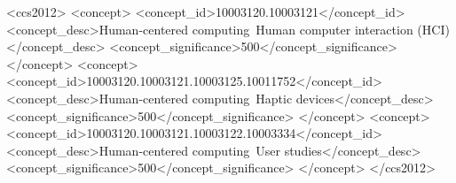 
\begin{CCSXML}
	<ccs2012>
	<concept>
	<concept_id>10003120.10003121</concept_id>
	<concept_desc>Human-centered computing~Human computer interaction (HCI)</concept_desc>
	<concept_significance>500</concept_significance>
	</concept>
	<concept>
	<concept_id>10003120.10003121.10003125.10011752</concept_id>
	<concept_desc>Human-centered computing~Haptic devices</concept_desc>
	<concept_significance>500</concept_significance>
	</concept>
	<concept>
	<concept_id>10003120.10003121.10003122.10003334</concept_id>
	<concept_desc>Human-centered computing~User studies</concept_desc>
	<concept_significance>500</concept_significance>
	</concept>
	</ccs2012>
\end{CCSXML}

